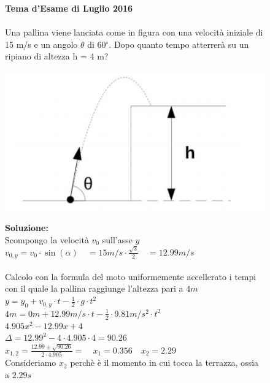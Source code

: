 \begin{figure}[h!]
\textbf{Tema d'Esame di Luglio 2016}\\ \\
Una pallina viene lanciata come in figura con una velocità iniziale di 15 m/s e un
angolo $\theta$ di 60$^{\circ}$. Dopo quanto tempo atterrerà su un ripiano di altezza h = 4 m?
\\
	\begin{center}
		\includegraphics[scale=0.7]{ES1/LUG012016.jpg}
	\end{center}
\begin{boxed}    
\textbf{Soluzione:}\\
Scompongo la velocità $v_0$ sull'asse $y$\\
$v_{0,y}= v_0 \cdot \sin(\alpha) \quad = 15m/s\cdot \frac{\sqrt{3}}{2} \quad = 12.99m/s$ \\ \\
Calcolo con la formula del moto uniformemente accellerato i tempi con il quale la pallina raggiunge l'altezza pari a $4m$ \\

$y= y_0 + v_{0,y}\cdot t -\frac{1}{2}\cdot g \cdot t^2$\\
$4m=0m+12.99m/s \cdot t -\frac{1}{2}\cdot 9.81 m/s^2 \cdot t^2 $\\
$4.905x^2 -12.99x +4 $\\
$\Delta=12.99^2-4\cdot 4.905 \cdot 4= 90.26 $\\
$ x_{1,2}=\frac{12.99 \pm \sqrt{90.26}}{2\cdot 4.905}= \quad x_1=0.356 \quad x_2=2.29$\\

Consideriamo $x_2$ perchè è il momento in cui tocca la terrazza, ossia a $2.29s$
\end{boxed}
\end{figure}
\clearpage


